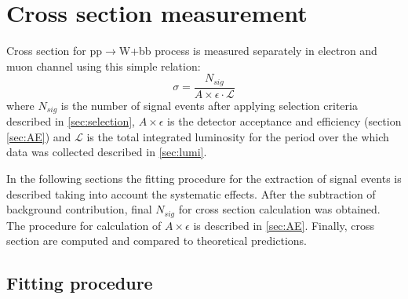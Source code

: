 
\chapter{Cross section measurement} %

\label{Chapter7} %



Cross section for pp$\rightarrow$W+bb process is measured separately in electron and muon channel using this simple relation:
\begin{equation}
\sigma = \frac{N_{sig}}{A\times \epsilon \cdot \mathcal{L}}
\end{equation}
where $N_{sig}$ is the number of signal events after applying selection criteria described in \ref{sec:selection}, $A\times \epsilon$ is the detector acceptance and efficiency (section \ref{sec:AE}) and $\mathcal{L}$ is the total integrated luminosity for the period over the which data was collected described in \ref{sec:lumi}. 
\par In the following sections the fitting procedure for the extraction of signal events is described taking into account the systematic effects. After the subtraction of background contribution, final $N_{sig}$ for cross section calculation was obtained. The procedure for calculation of $A\times \epsilon$ is described in \ref{sec:AE}. Finally, cross section are computed and compared to theoretical predictions. 


\section{Fitting procedure}

